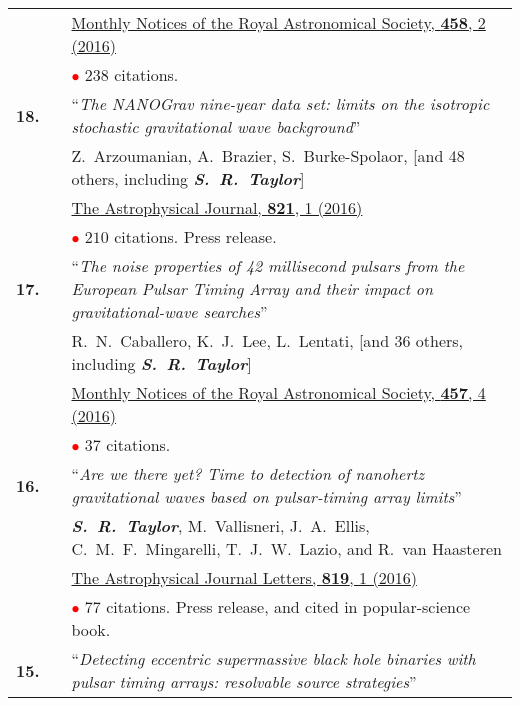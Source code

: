 \documentclass[11pt,letterpaper,sans]{moderncv}
\begin{document}
{\begin{longtable}{rp{0.3cm}p{15.8cm}}
&&  \href{http://mnras.oxfordjournals.org/content/458/2/1267}{{\color{color1} Monthly Notices of the Royal Astronomical Society, \textbf{458}, 2 (2016)}} \\
&& \textcolor{red}{$\bullet$} $238$ citations. \vspace{0.09cm}\\
\textbf{18.} & & ``\textit{The NANOGrav nine-year data set: limits on the isotropic stochastic gravitational wave background}'' \\ 
&& Z.~Arzoumanian, A.~Brazier, S.~Burke-Spolaor, [and 48 others, including \textit{\textbf{S.~R.~Taylor}}] \\ 
&&  \href{http://iopscience.iop.org/article/10.3847/0004-637X/821/1/13/meta}{{\color{color1} The Astrophysical Journal, \textbf{821}, 1 (2016)}} \\
&& \textcolor{red}{$\bullet$} $210$ citations. Press release. \vspace{0.09cm}\\
\textbf{17.} & & ``\textit{The noise properties of 42 millisecond pulsars from the European Pulsar Timing Array and their impact on gravitational-wave searches}'' \\ 
&& R.~N.~Caballero, K.~J.~Lee, L.~Lentati, [and 36 others, including \textit{\textbf{S.~R.~Taylor}}] \\ 
&&  \href{http://mnras.oxfordjournals.org/content/457/4/4421}{{\color{color1} Monthly Notices of the Royal Astronomical Society, \textbf{457}, 4 (2016)}} \\
&& \textcolor{red}{$\bullet$} $37$ citations. \vspace{0.09cm}\\
\textbf{16.} & & ``\textit{Are we there yet? Time to detection of nanohertz gravitational waves based on pulsar-timing array limits}'' \\ 
&& \textit{\textbf{S.~R.~Taylor}}, M.~Vallisneri, J.~A.~Ellis, C.~M.~F.~Mingarelli, T.~J.~W.~Lazio, and R.~van Haasteren \\ 
&&  \href{http://iopscience.iop.org/article/10.3847/2041-8205/819/1/L6/meta}{{\color{color1} The Astrophysical Journal Letters, \textbf{819}, 1 (2016)}} \\
&& \textcolor{red}{$\bullet$} $77$ citations. Press release, and cited in popular-science book. \vspace{0.09cm}\\
\textbf{15.} & & ``\textit{Detecting eccentric supermassive black hole binaries with pulsar timing arrays: resolvable source strategies}'' \\ 

\end{longtable}}
\end{document}
